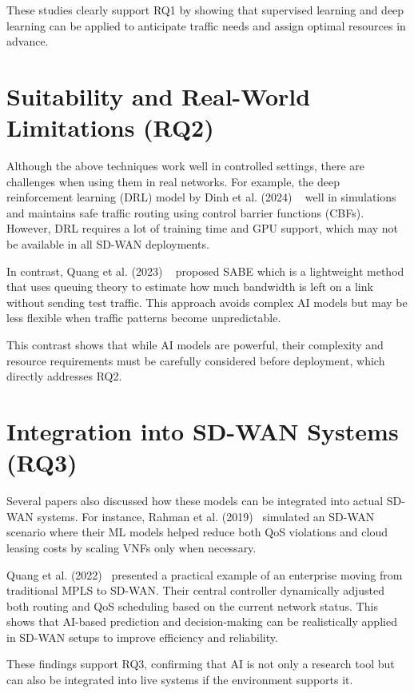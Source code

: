 \documentclass[a4paper,12pt]{Classes/RoboticsLaTeX}
\begin{document}
These studies clearly support RQ1 by showing that supervised learning and deep learning can be applied to anticipate traffic needs and assign optimal resources in advance.

\section{Suitability and Real-World Limitations (RQ2)}

Although the above techniques work well in controlled settings, there are challenges when using them in real networks. For example, the deep reinforcement learning (DRL) model by Dinh et al. (2024) ~\cite{dinh2024safeloadbalancing} well in simulations and maintains safe traffic routing using control barrier functions (CBFs). However, DRL requires a lot of training time and GPU support, which may not be available in all SD-WAN deployments.

In contrast, Quang et al. (2023) ~\cite{quang2023globalqos} proposed SABE which is a lightweight method that uses queuing theory to estimate how much bandwidth is left on a link without sending test traffic. This approach avoids complex AI models but may be less flexible when traffic patterns become unpredictable.

This contrast shows that while AI models are powerful, their complexity and resource requirements must be carefully considered before deployment, which directly addresses RQ2.

\section{Integration into SD-WAN Systems (RQ3)}

Several papers also discussed how these models can be integrated into actual SD-WAN systems. For instance, Rahman et al. (2019)~\cite{rahman2019autoscaling} simulated an SD-WAN scenario where their ML models helped reduce both QoS violations and cloud leasing costs by scaling VNFs only when necessary.

Quang et al. (2022)~\cite{quang2022routing} presented a practical example of an enterprise moving from traditional MPLS to SD-WAN. Their central controller dynamically adjusted both routing and QoS scheduling based on the current network status. This shows that AI-based prediction and decision-making can be realistically applied in SD-WAN setups to improve efficiency and reliability.

These findings support RQ3, confirming that AI is not only a research tool but can also be integrated into live systems if the environment supports it.
\end{document}
